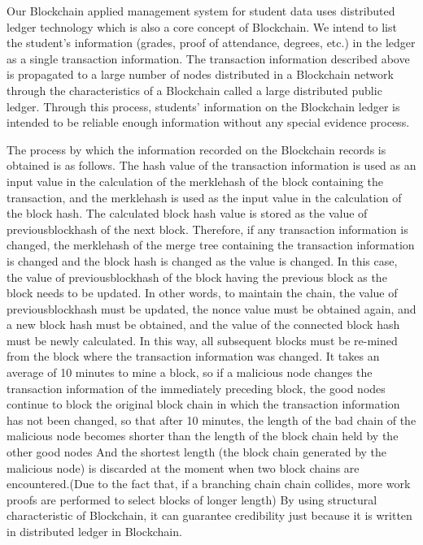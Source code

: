 \documentclass[conference]{IEEEtran}
\begin{document}
Our Blockchain applied management system for student data uses distributed ledger technology which is also a core concept of Blockchain. We intend to list the student's information (grades, proof of attendance, degrees, etc.) in the ledger as a single transaction information. The transaction information described above is propagated to a large number of nodes distributed in a Blockchain network through the characteristics of a Blockchain called a large distributed public ledger. Through this process, students' information on the Blockchain ledger is intended to be reliable enough information without any special evidence process. 

The process by which the information recorded on the Blockchain records is obtained is as follows. The hash value of the transaction information is used as an input value in the calculation of the merklehash of the block containing the transaction, and the merklehash is used as the input value in the calculation of the block hash. The calculated block hash value is stored as the value of previousblockhash of the next block. Therefore, if any transaction information is changed, the merklehash of the merge tree containing the transaction information is changed and the block hash is changed as the value is changed. In this case, the value of previousblockhash of the block having the previous block as the block needs to be updated. In other words, to maintain the chain, the value of previousblockhash must be updated, the nonce value must be obtained again, and a new block hash must be obtained, and the value of the connected block hash must be newly calculated. In this way, all subsequent blocks must be re-mined from the block where the transaction information was changed. It takes an average of 10 minutes to mine a block, so if a malicious node changes the transaction information of the immediately preceding block, the good nodes continue to block the original block chain in which the transaction information has not been changed, so that after 10 minutes, the length of the bad chain of the malicious node becomes shorter than the length of the block chain held by the other good nodes And the shortest length (the block chain generated by the malicious node) is discarded at the moment when two block chains are encountered.(Due to the fact that, if a branching chain chain collides, more work proofs are performed to select blocks of longer length) By using structural characteristic of Blockchain, it can guarantee credibility just because it is written in distributed ledger in Blockchain. 
\end{document}
